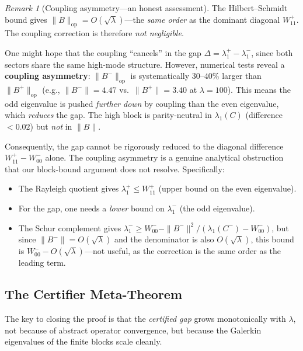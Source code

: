 \documentclass[12pt,a4paper]{article}
\theoremstyle{definition}
\theoremstyle{remark}
\newtheorem{remark}[theorem]{Remark}
\begin{document}
\begin{remark}[Coupling asymmetry---an honest assessment]
\label{rem:coupling-revisited}
The Hilbert--Schmidt bound gives $\|B\|_{\mathrm{op}} = O(\sqrt{\lambda})$---the \emph{same order} as the dominant diagonal $W_{11}^+$. The coupling correction is therefore \emph{not negligible}.

One might hope that the coupling ``cancels'' in the gap $\Delta = \lambda_1^+ - \lambda_1^-$, since both sectors share the same high-mode structure. However, numerical tests reveal a \textbf{coupling asymmetry}: $\|B^-\|_{\mathrm{op}}$ is systematically $30$--$40\%$ larger than $\|B^+\|_{\mathrm{op}}$ (e.g., $\|B^-\| = 4.47$ vs.\ $\|B^+\| = 3.40$ at $\lambda = 100$). This means the odd eigenvalue is pushed \emph{further down} by coupling than the even eigenvalue, which \emph{reduces} the gap. The high block is parity-neutral in $\lambda_1(C)$ (difference $< 0.02$) but \emph{not} in $\|B\|$.

Consequently, the gap cannot be rigorously reduced to the diagonal difference $W_{11}^+ - W_{00}^-$ alone. The coupling asymmetry is a genuine analytical obstruction that our block-bound argument does not resolve. Specifically:
\begin{itemize}
  \item The Rayleigh quotient gives $\lambda_1^+ \leq W_{11}^+$ (upper bound on the even eigenvalue).
  \item For the gap, one needs a \emph{lower} bound on $\lambda_1^-$ (the odd eigenvalue).
  \item The Schur complement gives $\lambda_1^- \geq W_{00}^- - \|B^-\|^2/(\lambda_1(C^-) - W_{00}^-)$, but since $\|B^-\| = O(\sqrt{\lambda})$ and the denominator is also $O(\sqrt{\lambda})$, this bound is $W_{00}^- - O(\sqrt{\lambda})$---not useful, as the correction is the same order as the leading term.
\end{itemize}
\end{remark}

\subsection{The Certifier Meta-Theorem}
\label{sec:meta-theorem}

The key to closing the proof is that the \emph{certified gap} grows monotonically with $\lambda$, not because of abstract operator convergence, but because the Galerkin eigenvalues of the finite blocks scale cleanly.
\end{document}
